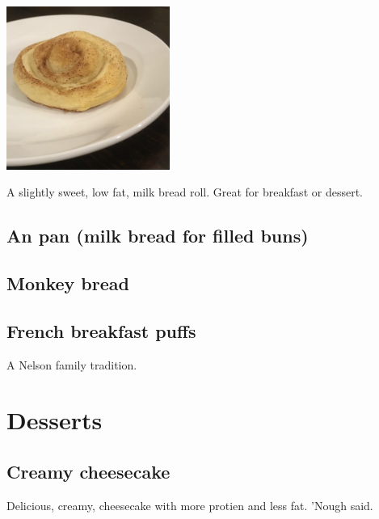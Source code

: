 \documentclass[
]{book}
\begin{document}
\includegraphics[width=0.4\textwidth,height=\textheight]{snail_roll_small.jpg}

A slightly sweet, low fat, milk bread roll. Great for breakfast or dessert.

\hypertarget{anpan}{%
\subsection*{An pan (milk bread for filled buns)}\label{anpan}}

\hypertarget{monkey}{%
\subsection*{Monkey bread}\label{monkey}}

\hypertarget{frenchpuffs}{%
\subsection*{French breakfast puffs}\label{frenchpuffs}}

A Nelson family tradition.

\hypertarget{desserts}{%
\section*{Desserts}\label{desserts}}

\hypertarget{cheesecake}{%
\subsection*{Creamy cheesecake}\label{cheesecake}}

Delicious, creamy, cheesecake with more protien and less fat. 'Nough said.
\end{document}
